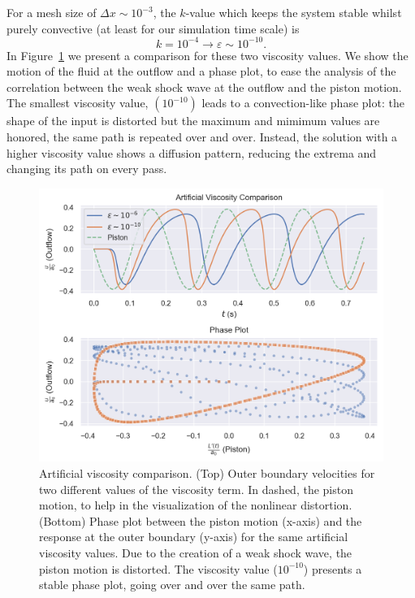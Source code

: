 \documentclass[../../thesis.tex]{subfiles}
\begin{document}
For a mesh size of $\Delta x \sim 10^{-3}$,
the $k$-value which keeps the system stable whilst purely convective 
(at least for our simulation time scale) is
\begin{equation*}
    k = 10^{-4} \rightarrow \varepsilon \sim 10^{-10}.
\end{equation*}
In Figure~\ref{fig:artificial_viscosity_comparison} we present a comparison for these two viscosity values.
We show the motion of the fluid at the outflow and a phase plot, to ease the analysis of the correlation between the weak shock wave at the outflow and the piston motion.
The smallest viscosity value, $(10^{-10})$ leads to a \mbox{convection-like} phase plot:
the shape of the input is distorted but the maximum and mimimum values are honored, 
the same path is repeated over and over.
Instead, the solution with a higher viscosity value shows a diffusion pattern, 
reducing the extrema and changing its path on every pass.
\begin{figure}[!h]
    \centering
    \includegraphics[width=1.0\columnwidth]{research_project/piston/figures/artificial_viscosity/artificial_viscosity_comparison.png}
    \caption{Artificial viscosity comparison.
    (Top) Outer boundary velocities for two different values of the viscosity term.
    In dashed, the piston motion, to help in the visualization of the nonlinear distortion.
    (Bottom) Phase plot between the piston motion (x-axis) and the response at the outer boundary (y-axis) for the same artificial viscosity values.
    Due to the creation of a weak shock wave, the piston motion is distorted.
    The viscosity value ($10^{-10}$) presents a stable phase plot, going over and over the same path. 
    }
    \label{fig:artificial_viscosity_comparison}
\end{figure}
\end{document}
